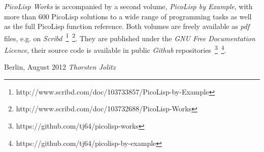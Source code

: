 \emph{PicoLisp Works} is accompanied by a second volume,
\emph{PicoLisp by Example}, with more than 600 PicoLisp solutions to a
wide range of programming tasks as well as the full PicoLisp function
reference. Both volumes are freely available as \emph{pdf} files, e.g.
on
\emph{Scribd}~\footnote{http://www.scribd.com/doc/103733857/PicoLisp-by-Example}~\footnote{http://www.scribd.com/doc/103732688/PicoLisp-Works}.
They are published under the \emph{GNU Free Documentation Licence},
their source code is available in public \emph{Github}
repositories~\footnote{https://github.com/tj64/picolisp-works}~\footnote{https://github.com/tj64/picolisp-by-example}.



\vspace{1cm}
\begin{flushright}\noindent
Berlin, August 2012 \hfill {\it Thorsten Jolitz}\\
\end{flushright}

\vfill




